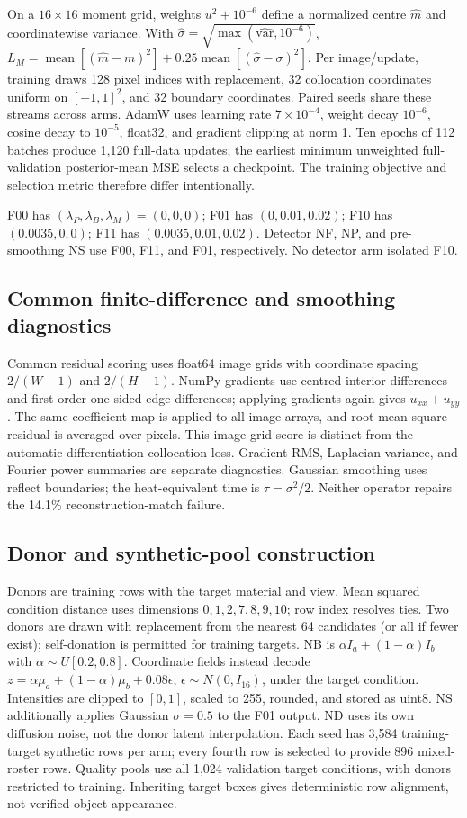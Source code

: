On a $16\times16$ moment grid, weights $u^2+10^{-6}$ define a normalized centre $\hat m$ and coordinatewise variance. With $\hat\sigma=\sqrt{\max(\widehat{\mathrm{var}},10^{-6})}$,
$L_M=\operatorname{mean}[(\hat m-m)^2]+0.25\operatorname{mean}[(\hat\sigma-\sigma)^2]$.
Per image/update, training draws 128 pixel indices with replacement, 32 collocation coordinates uniform on $[-1,1]^2$, and 32 boundary coordinates. Paired seeds share these streams across arms. AdamW uses learning rate $7\times10^{-4}$, weight decay $10^{-6}$, cosine decay to $10^{-5}$, float32, and gradient clipping at norm 1. Ten epochs of 112 batches produce 1,120 full-data updates; the earliest minimum unweighted full-validation posterior-mean MSE selects a checkpoint. The training objective and selection metric therefore differ intentionally.

F00 has $(\lambda_P,\lambda_B,\lambda_M)=(0,0,0)$; F01 has $(0,0.01,0.02)$; F10 has $(0.0035,0,0)$; F11 has $(0.0035,0.01,0.02)$. Detector NF, NP, and pre-smoothing NS use F00, F11, and F01, respectively. No detector arm isolated F10.

\subsection{Common finite-difference and smoothing diagnostics}
Common residual scoring uses float64 image grids with coordinate spacing $2/(W-1)$ and $2/(H-1)$. NumPy gradients use centred interior differences and first-order one-sided edge differences; applying gradients again gives $u_{xx}+u_{yy}$. The same coefficient map is applied to all image arrays, and root-mean-square residual is averaged over pixels. This image-grid score is distinct from the automatic-differentiation collocation loss. Gradient RMS, Laplacian variance, and Fourier power summaries are separate diagnostics. Gaussian smoothing uses reflect boundaries; the heat-equivalent time is $\tau=\sigma^2/2$. Neither operator repairs the 14.1\% reconstruction-match failure.

\subsection{Donor and synthetic-pool construction}
Donors are training rows with the target material and view. Mean squared condition distance uses dimensions $0,1,2,7,8,9,10$; row index resolves ties. Two donors are drawn with replacement from the nearest 64 candidates (or all if fewer exist); self-donation is permitted for training targets. NB is $\alpha I_a+(1-\alpha)I_b$ with $\alpha\sim U[0.2,0.8]$. Coordinate fields instead decode $z=\alpha\mu_a+(1-\alpha)\mu_b+0.08\epsilon$, $\epsilon\sim N(0,I_{16})$, under the target condition. Intensities are clipped to $[0,1]$, scaled to 255, rounded, and stored as uint8. NS additionally applies Gaussian $\sigma=0.5$ to the F01 output. ND uses its own diffusion noise, not the donor latent interpolation. Each seed has 3,584 training-target synthetic rows per arm; every fourth row is selected to provide 896 mixed-roster rows. Quality pools use all 1,024 validation target conditions, with donors restricted to training. Inheriting target boxes gives deterministic row alignment, not verified object appearance.

